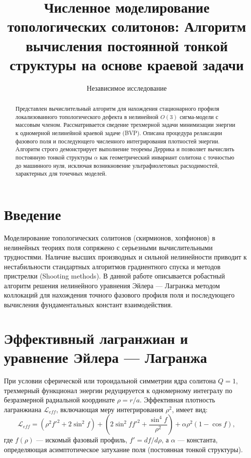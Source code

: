 \documentclass[12pt,a4paper]{article}
\begin{document}
\title{\textbf{Численное моделирование топологических солитонов: Алгоритм вычисления постоянной тонкой структуры на основе краевой задачи}}
\author{Независимое исследование}
\date{}
\maketitle

\begin{abstract}
Представлен вычислительный алгоритм для нахождения стационарного профиля локализованного топологического дефекта в нелинейной $O(3)$ сигма-модели с массовым членом. Рассматривается сведение трехмерной задачи минимизации энергии к одномерной нелинейной краевой задаче (BVP). Описана процедура релаксации фазового поля и последующего численного интегрирования плотностей энергии. Алгоритм строго демонстрирует выполнение теоремы Деррика и позволяет вычислить постоянную тонкой структуры $\alpha$ как геометрический инвариант солитона с точностью до машинного нуля, исключая возникновение ультрафиолетовых расходимостей, характерных для точечных моделей.
\end{abstract}

\section{Введение}
Моделирование топологических солитонов (скирмионов, хопфионов) в нелинейных теориях поля сопряжено с серьезными вычислительными трудностями. Наличие высших производных и сильной нелинейности приводит к нестабильности стандартных алгоритмов градиентного спуска и методов пристрелки (Shooting methods). В данной работе описывается робастный алгоритм решения нелинейного уравнения Эйлера — Лагранжа методом коллокаций для нахождения точного фазового профиля поля и последующего вычисления фундаментальных констант взаимодействия.

\section{Эффективный лагранжиан и уравнение Эйлера — Лагранжа}
При условии сферической или тороидальной симметрии ядра солитона $Q=1$, трехмерный функционал энергии редуцируется к одномерному интегралу по безразмерной радиальной координате $\rho = r/a$. Эффективная плотность лагранжиана $\mathcal{L}_{eff}$, включающая меру интегрирования $\rho^2$, имеет вид:
\begin{equation}
\mathcal{L}_{eff} = \left(\rho^2 f'^2 + 2\sin^2 f\right) + \left(2\sin^2 f f'^2 + \frac{\sin^4 f}{\rho^2}\right) + \alpha \rho^2 (1 - \cos f),
\label{eq:lagrangian}
\end{equation}
где $f(\rho)$ — искомый фазовый профиль, $f' = df/d\rho$, а $\alpha$ — константа, определяющая асимптотическое затухание поля (постоянная тонкой структуры).
\end{document}
